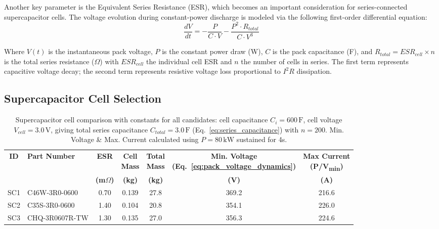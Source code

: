 \documentclass[11pt, a4paper]{report}
\numberwithin{equation}{section}
\begin{document}
Another key parameter is the Equivalent Series Resistance (ESR), which becomes an important consideration for series-connected supercapacitor cells. The voltage evolution during constant-power discharge is modeled via the following first-order differential equation:
\begin{equation}
\frac{dV}{dt} = -\frac{P}{C \cdot V} - \frac{P^2 \cdot R_{total}}{C \cdot V^3}
\label{eq:pack_voltage_dynamics}
\end{equation}

Where $V(t)$ is the instantaneous pack voltage, $P$ is the constant power draw (W), $C$ is the pack capacitance (F), and $R_{total} = ESR_{cell} \times n$ is the total series resistance (\(\Omega\)) with $ESR_{cell}$ the individual cell ESR and $n$ the number of cells in series. The first term represents capacitive voltage decay; the second term represents resistive voltage loss proportional to $I^2 R$ dissipation.

\subsection{Supercapacitor Cell Selection}
\begin{table}[htbp]
    \centering
    \caption{Supercapacitor cell comparison with constants for all candidates: cell capacitance $C_i=600\,\text{F}$, cell voltage $V_{cell}=3.0\,\text{V}$, giving total series capacitance $C_{total}=3.0\,\text{F}$ (Eq.~\ref{eq:series_capacitance}) with $n=200$. Min. Voltage \& Max. Current calculated using $P=80\,\text{kW}$ sustained for 4s.}
    \label{tab:supercap_cells}
    \begin{tabular}{|c|l|c|c|c|c|c|}
        \hline
        \textbf{ID} & \textbf{Part Number} & \textbf{ESR} & \makecell{\textbf{Cell} \\ \textbf{Mass}} & \makecell{\textbf{Total} \\ \textbf{Mass}} & \makecell{\textbf{Min. Voltage} \\ \textbf{(Eq.~\ref{eq:pack_voltage_dynamics})}} & \makecell{\textbf{Max Current} \\ \textbf{(P/V\textsubscript{min})}} \\
        & & \textbf{(m$\Omega$)} & \textbf{(kg)} & \textbf{(kg)} & \textbf{(V)} & \textbf{(A)} \\
        \hline
        SC1 & C46W-3R0-0600 \cite{sech-c46w-3r0-0600} & 0.70 & 0.139 & 27.8 & 369.2 & 216.6 \\
        SC2 & C35S-3R0-0600 \cite{gmcc-c35s-3r0-0600} & 1.40 & 0.104 & 20.8 & 354.1 & 226.0 \\
        SC3 & CHQ-3R0607R-TW \cite{cda-chq-3r0607r-tw} & 1.30 & 0.135 & 27.0 & 356.3 & 224.6 \\
        \hline
    \end{tabular}
\end{table}
\end{document}
